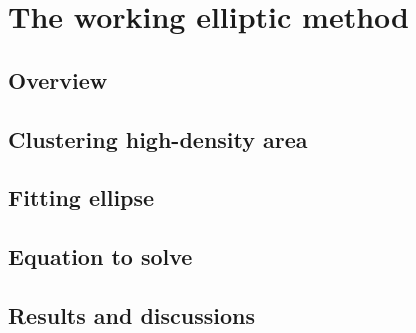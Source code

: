 \section{The working elliptic method}


\subsection{Overview}


\subsection{Clustering high-density area}


\subsection{Fitting ellipse}


\subsection{Equation to solve}


\subsection{Results and discussions}
